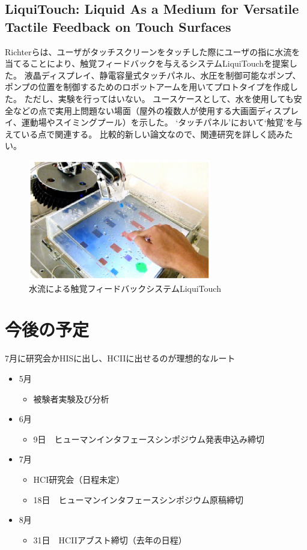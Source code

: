\documentclass[11pt,a4paper]{jarticle}
\begin{document}
\subsection{LiquiTouch: Liquid As a Medium for Versatile Tactile Feedback on Touch Surfaces\cite{Richter:2013}}
Richterらは、ユーザがタッチスクリーンをタッチした際にユーザの指に水流を当てることにより、触覚フィードバックを与えるシステムLiquiTouchを提案した。
液晶ディスプレイ、静電容量式タッチパネル、水圧を制御可能なポンプ、ポンプの位置を制御するためのロボットアームを用いてプロトタイプを作成した。
ただし、実験を行ってはいない。
ユースケースとして、水を使用しても安全などの点で実用上問題ない場面（屋外の複数人が使用する大画面ディスプレイ、運動場やスイミングプール）を示した。
`タッチパネル'において`触覚'を与えている点で関連する。
比較的新しい論文なので、関連研究を詳しく読みたい。
\begin{figure}[H]
  \begin{center}
  \includegraphics[width=8cm]{fig/figure6.eps}
  \caption{水流による触覚フィードバックシステムLiquiTouch}
  \end{center}
\end{figure}


\section{今後の予定}
7月に研究会かHISに出し、HCIIに出せるのが理想的なルート
\begin{itemize}
  \item 5月
  \begin{itemize}
    \item 被験者実験及び分析
  \end{itemize}
  \item 6月
  \begin{itemize}
    \item 9日　ヒューマンインタフェースシンポジウム発表申込み締切
  \end{itemize}
  \item 7月
  \begin{itemize}
    \item HCI研究会（日程未定）
    \item 18日　ヒューマンインタフェースシンポジウム原稿締切
  \end{itemize}
  \item 8月
  \begin{itemize}
    \item 31日　HCIIアブスト締切（去年の日程）
  \end{itemize}
\end{itemize}


\end{document}
